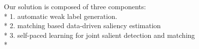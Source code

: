 Our solution is composed of three components:\\*
1. automatic weak label generation. \\*
2. matching based data-driven saliency estimation\\*
3. self-paced learning for joint salient detection and matching\\*

 
